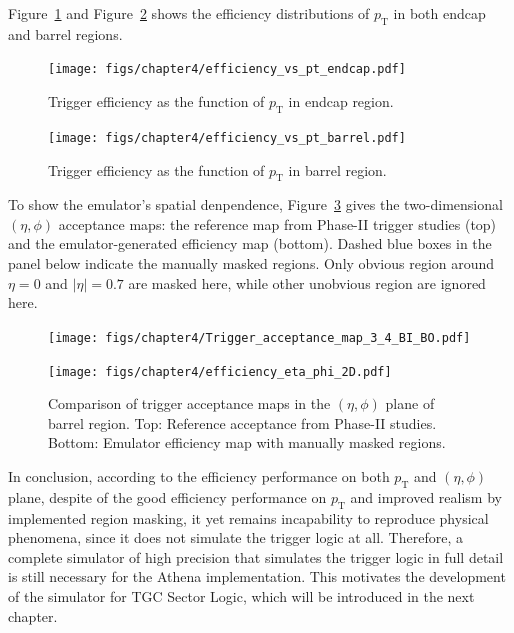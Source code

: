 Figure~\ref{fig:eff_pt_endcap} and Figure~\ref{fig:eff_pt_barrel} shows the efficiency distributions of $p_\mathrm{T}$ in both endcap and barrel regions.

\begin{figure}[htbp]
  \centering
  \texttt{[image: figs/chapter4/efficiency\_vs\_pt\_endcap.pdf]}
  \caption{Trigger efficiency as the function of $p_\mathrm{T}$ in endcap region.}
  \label{fig:eff_pt_endcap}
\end{figure}

\begin{figure}[htbp]
  \centering
  \texttt{[image: figs/chapter4/efficiency\_vs\_pt\_barrel.pdf]}
  \caption{Trigger efficiency as the function of $p_\mathrm{T}$ in barrel region.}
  \label{fig:eff_pt_barrel}
\end{figure}

To show the emulator's spatial denpendence, Figure~\ref{fig:eta_phi_comparison} gives the two-dimensional $(\eta, \phi)$ acceptance maps: the reference map from Phase-II trigger studies (top) and the emulator-generated efficiency map (bottom). Dashed blue boxes in the panel below indicate the manually masked regions. Only obvious region around $\eta = 0$ and $|\eta| = 0.7$ are masked here, while other unobvious region are ignored here.

\begin{figure}[htbp]
  \centering
  \texttt{[image: figs/chapter4/Trigger\_acceptance\_map\_3\_4\_BI\_BO.pdf]}
  \vspace{0.5em}
  
  \texttt{[image: figs/chapter4/efficiency\_eta\_phi\_2D.pdf]}
  
  \caption{Comparison of trigger acceptance maps in the $(\eta, \phi)$ plane of barrel region. Top: Reference acceptance from Phase-II studies. Bottom: Emulator efficiency map with manually masked regions.}
  \label{fig:eta_phi_comparison}
\end{figure}

In conclusion, according to the efficiency performance on both $p_\mathrm{T}$ and $(\eta, \phi)$ plane, despite of the good efficiency performance on $p_\mathrm{T}$ and improved realism by implemented region masking, it yet remains incapability to reproduce physical phenomena, since it does not simulate the trigger logic at all. Therefore, a complete simulator of high precision that simulates the trigger logic in full detail is still necessary for the Athena implementation. This motivates the development of the simulator for TGC Sector Logic, which will be introduced in the next chapter.
